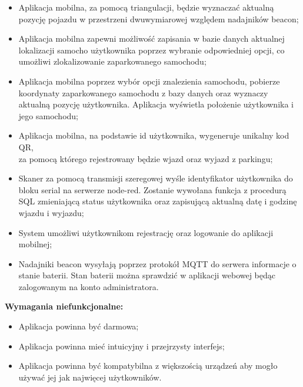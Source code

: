 \documentclass[12pt,a4paper]{article}
\begin{document}
\begin{itemize}
\item Aplikacja mobilna, za pomocą triangulacji, będzie wyznaczać aktualną pozycję pojazdu w przestrzeni dwuwymiarowej względem nadajników beacon;
\item Aplikacja mobilna zapewni możliwość zapisania w bazie danych aktualnej lokalizacji samocho użytkownika poprzez wybranie odpowiedniej opcji, co umożliwi zlokalizowanie zaparkowanego samochodu;
\item Aplikacja mobilna poprzez wybór opcji znalezienia samochodu, pobierze koordynaty zaparkowanego samochodu z bazy danych oraz wyznaczy aktualną pozycję użytkownika. Aplikacja wyświetla położenie użytkownika i jego samochodu;
\item Aplikacja mobilna, na podstawie id użytkownika, wygeneruje unikalny kod QR,\\za pomocą którego rejestrowany będzie wjazd oraz wyjazd z parkingu;
\item Skaner za pomocą transmisji szeregowej wyśle identyfikator użytkownika do bloku serial na serwerze node-red. Zostanie wywołana funkcja z procedurą SQL zmieniającą status użytkownika oraz zapisującą aktualną datę i godzinę wjazdu i wyjazdu;
\item System umożliwi użytkownikom rejestrację oraz logowanie do aplikacji mobilnej;
\item Nadajniki beacon wysyłają poprzez protokół  MQTT do serwera informacje o stanie baterii. Stan baterii można sprawdzić w aplikacji webowej będąc zalogowanym na konto administratora.
\end{itemize}
{\large \bf Wymagania niefunkcjonalne:}
\begin{itemize}
\item Aplikacja powinna być darmowa;
\item Aplikacja powinna mieć intuicyjny i przejrzysty interfejs;
\item Aplikacja powinna być kompatybilna z większością urządzeń aby mogło używać jej jak najwięcej użytkowników.
\end{itemize}



\newpage
\end{document}
